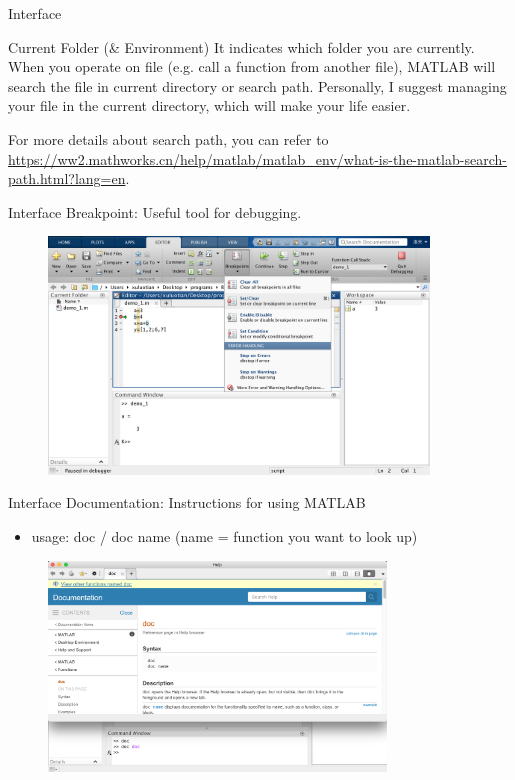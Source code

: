 \begin{frame}{Interface}
\begin{block}{Current Folder (\& Environment)}
It indicates which folder you are currently. When you operate on file (e.g. call a function from another file), MATLAB will search the file in current directory or search path. Personally, I suggest managing your file in the current directory, which will make your life easier.

For more details about search path, you can refer to \url{https://ww2.mathworks.cn/help/matlab/matlab_env/what-is-the-matlab-search-path.html?lang=en}.
\end{block}
\end{frame}

\begin{frame}{Interface}
Breakpoint: Useful tool for debugging.
\begin{figure}[htbp]
\centering
\includegraphics[width=0.9\textwidth]{pic/breakpoint.png}
\end{figure}
\end{frame}

\begin{frame}{Interface}
Documentation: Instructions for using MATLAB
\begin{itemize}
\item usage: doc / doc name (name = function you want to look up)
\end{itemize}
\begin{figure}[htbp]
\centering
\includegraphics[width=0.8\textwidth]{pic/documentation.png}
\end{figure}
\end{frame}

